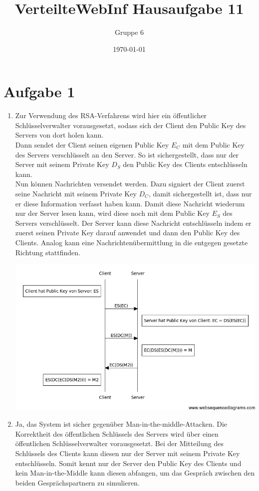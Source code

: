 \documentclass[a4paper]{scrartcl}
\author{Gruppe 6}
\title{\textbf{VerteilteWebInf Hausaufgabe 11}}
\date{\today}
\begin{document}
\maketitle

\section*{Aufgabe 1}
\begin{enumerate}[label=\alph*)]

\item Zur Verwendung des RSA-Verfahrens wird hier ein öffentlicher Schlüsselverwalter vorausgesetzt, sodass sich der Client den Public Key des Servers von dort holen kann. \\
Dann sendet der Client seinen eigenen Public Key $ E_C $ mit dem Public Key des Servers verschlüsselt an den Server. So ist sichergestellt, dass nur der Server mit seinem Private Key $ D_S $ den Public Key des Clients entschlüsseln kann. \\
Nun können Nachrichten versendet werden. Dazu signiert der Client zuerst seine Nachricht mit seinem Private Key $ D_C $, damit sichergestellt ist, dass nur er diese Information verfasst haben kann. Damit diese Nachricht wiederum nur der Server lesen kann, wird diese noch mit dem Public Key $ E_S $ des Servers verschlüsselt. Der Server kann diese Nachricht entschlüsseln indem er zuerst seinen Private Key darauf anwendet und dann den Public Key des Clients. Analog kann eine Nachrichtenübermittlung in die entgegen gesetzte Richtung stattfinden. 

\includegraphics[width=15cm]{sequenzdiagramm.png}

\item Ja, das System ist sicher gegenüber Man-in-the-middle-Attacken. Die Korrektheit des öffentlichen Schlüssels des Servers wird über einen öffentlichen Schlüsselverwalter vorausgesetzt. Bei der Mitteilung des Schlüssels des Clients kann diesen nur der Server mit seinem Private Key entschlüsseln. Somit kennt nur der Server den Public Key des Clients und kein Man-in-the-Middle kann diesen abfangen, um das Gespräch zwischen den beiden Gesprächspartnern zu simulieren. 


\end{enumerate}
\end{document}
